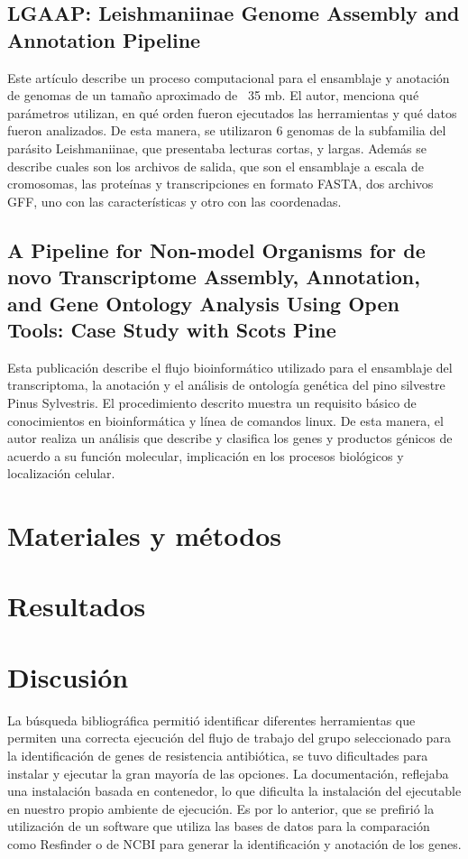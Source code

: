 \documentclass[12pt]{article}
\begin{document}
\subsection*{LGAAP: Leishmaniinae Genome Assembly and Annotation Pipeline}
Este artículo describe un proceso computacional para el ensamblaje y anotación de genomas de un tamaño aproximado de ~35 mb. El autor, menciona qué parámetros utilizan, en qué orden fueron ejecutados las herramientas y qué datos fueron analizados.  De esta manera, se utilizaron 6 genomas de la subfamilia del parásito Leishmaniinae, que presentaba lecturas cortas, y largas. Además se describe cuales son los archivos de salida, que son el ensamblaje a escala de cromosomas, las proteínas y transcripciones en formato FASTA, dos archivos GFF, uno con las características y otro con las coordenadas.

\subsection*{A Pipeline for Non-model Organisms for de novo Transcriptome Assembly, Annotation, and Gene Ontology Analysis Using Open Tools: Case Study with Scots Pine }
Esta publicación describe el flujo bioinformático utilizado para el ensamblaje del transcriptoma, la anotación y el análisis de ontología genética del pino silvestre Pinus Sylvestris. El procedimiento descrito muestra un requisito básico de conocimientos en bioinformática  y línea de comandos linux. De esta manera, el autor realiza un análisis que describe y clasifica los genes y productos génicos de acuerdo a su función molecular, implicación en los procesos biológicos y localización celular.


\newpage
\section{Materiales y métodos}

\newpage
\section{Resultados}

\newpage
\section{Discusión}
La búsqueda bibliográfica permitió identificar diferentes herramientas que permiten una correcta ejecución del flujo de trabajo del grupo seleccionado para la identificación de genes de resistencia antibiótica, se tuvo dificultades para instalar y ejecutar la gran mayoría de las opciones. La documentación, reflejaba una instalación basada en contenedor, lo que dificulta la instalación del ejecutable en nuestro propio ambiente de ejecución. Es por lo anterior, que se prefirió la utilización de un software que utiliza las bases de datos para la comparación como Resfinder o de NCBI para generar la identificación y anotación de los genes. 
\end{document}
